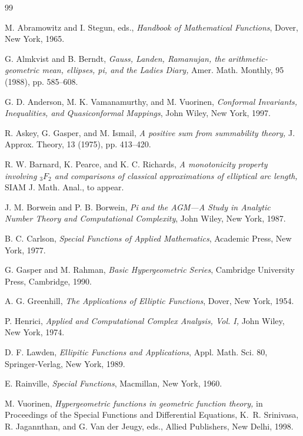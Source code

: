 \documentclass[final]{siamltex}
\begin{document}
\begin{thebibliography}{99}

{\sc M. Abramowitz and I. Stegun, eds.,} 
{\em Handbook of Mathematical Functions}, 
Dover, New York, 1965.

{\sc G. Almkvist and B. Berndt,} 
{\it Gauss, Landen, Ramanujan, the
arithmetic-geometric mean, ellipses, pi, and the Ladies Diary,} 
Amer. Math. Monthly, 95 (1988), pp. 585--608.

{\sc G. D. Anderson, M. K. Vamanamurthy, and M. Vuorinen,}
{\em Conformal Invariants, Inequalities, and Quasiconformal Mappings},
John Wiley, New York, 1997.

{\sc R. Askey, G. Gasper, and M. Ismail,}
{\em A positive sum from summability theory,} 
J. Approx. Theory, 13 (1975), pp. 413--420.

{\sc R. W. Barnard, K. Pearce, and K. C. Richards,} 
{\em A monotonicity property involving ${}_{3}F_{2}$ and comparisons 
of classical approximations of elliptical arc length,} 
SIAM J. Math. Anal., to appear.

{\sc J. M. Borwein and P. B. Borwein,}
{\em Pi and the AGM---A Study in Analytic Number Theory and 
Computational Complexity}, 
John Wiley, New York, 1987.

{\sc B. C. Carlson,} 
{\em Special Functions of Applied Mathematics}, 
Academic Press, New York, 1977.

{\sc G. Gasper and M. Rahman,} 
{\em Basic Hypergeometric Series}, 
Cambridge University Press, Cambridge, 1990.

{\sc A. G. Greenhill,} 
{\em The Applications of Elliptic Functions}, 
Dover, New York, 1954.

{\sc P. Henrici,} 
{\em Applied and Computational Complex Analysis, {\rm Vol. I},} 
John Wiley, New York, 1974.

{\sc D. F. Lawden,} 
{\em Ellipitic Functions and Applications}, 
Appl. Math. Sci. 80, Springer-Verlag, New York, 1989.

{\sc E. Rainville,} 
{\em Special Functions}, 
Macmillan, New York, 1960.

{\sc M. Vuorinen,} 
{\em Hypergeometric functions in geometric function theory,}
in Proceedings of the Special Functions and Differential Equations,
K.~R. Srinivasa, R. Jagannthan, and G. Van der Jeugy, eds.,
Allied Publishers, New Delhi, 1998.

\end{thebibliography}
\end{document}
